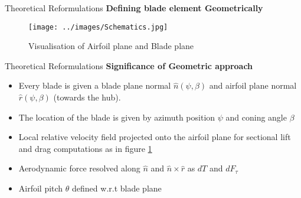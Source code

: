 \begin{frame}{Theoretical Reformulations}
  \textbf{Defining blade element Geometrically}
  \begin{figure}
      \centering
      \texttt{[image: ../images/Schematics.jpg]}
      \caption{Visualisation of Airfoil plane and Blade plane}
      \label{fig: Schematics}
  \end{figure}
\end{frame}
\begin{frame}{Theoretical Reformulations}
    \textbf{Significance of Geometric approach}
    \begin{itemize}
        \item Every blade is given a blade plane normal $\hat{n}(\psi,\beta)$ and airfoil plane normal $\hat{r}(\psi,\beta)$ (towards the hub).
        \item The location of the blade is given by azimuth position $\psi$ and coning angle $\beta$
        \item Local relative velocity field projected onto the airfoil plane for sectional lift and drag computations as in figure 
        \ref{fig: Schematics}
        \item Aerodynamic force resolved along $\hat{n}$ and $\hat{n}\times\hat{r}$ as $dT$ and $dF_{\tau}$
        \item Airfoil pitch $\theta$ defined w.r.t blade plane
    \end{itemize}
\end{frame}
